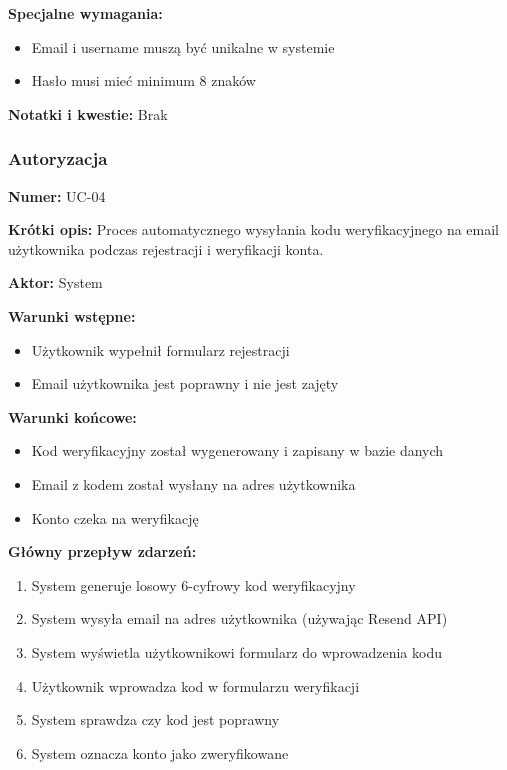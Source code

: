 \documentclass[12pt,a4paper]{article}
\begin{document}
\textbf{Specjalne wymagania:}
\begin{itemize}[leftmargin=*]
    \item Email i username muszą być unikalne w systemie
    \item Hasło musi mieć minimum 8 znaków
\end{itemize}

\textbf{Notatki i kwestie:} Brak

\subsubsection{Autoryzacja}

\textbf{Numer:} UC-04

\textbf{Krótki opis:} Proces automatycznego wysyłania kodu weryfikacyjnego na email użytkownika podczas rejestracji i weryfikacji konta.

\textbf{Aktor:} System

\textbf{Warunki wstępne:}
\begin{itemize}[leftmargin=*]
    \item Użytkownik wypełnił formularz rejestracji
    \item Email użytkownika jest poprawny i nie jest zajęty
\end{itemize}

\textbf{Warunki końcowe:}
\begin{itemize}[leftmargin=*]
    \item Kod weryfikacyjny został wygenerowany i zapisany w bazie danych
    \item Email z kodem został wysłany na adres użytkownika
    \item Konto czeka na weryfikację
\end{itemize}

\textbf{Główny przepływ zdarzeń:}
\begin{enumerate}[leftmargin=*]
    \item System generuje losowy 6-cyfrowy kod weryfikacyjny
    \item System wysyła email na adres użytkownika (używając Resend API)
    \item System wyświetla użytkownikowi formularz do wprowadzenia kodu
    \item Użytkownik wprowadza kod w formularzu weryfikacji
    \item System sprawdza czy kod jest poprawny
    \item System oznacza konto jako zweryfikowane
\end{enumerate}
\end{document}

